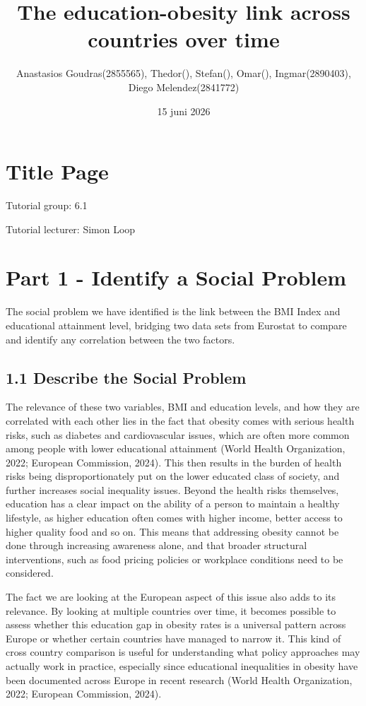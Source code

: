 \documentclass[
]{article}
\title{The education-obesity link across countries over time}
\author{Anastasios Goudras(2855565), Thedor(), Stefan(), Omar(),
Ingmar(2890403), Diego Melendez(2841772)}
\date{15 juni 2026}
\begin{document}
\maketitle

{
\setcounter{tocdepth}{2}
\tableofcontents
}
\section{Title Page}\label{title-page}

Tutorial group: 6.1

Tutorial lecturer: Simon Loop

\section{Part 1 - Identify a Social
Problem}\label{part-1---identify-a-social-problem}

The social problem we have identified is the link between the BMI Index
and educational attainment level, bridging two data sets from Eurostat
to compare and identify any correlation between the two factors.

\subsection{1.1 Describe the Social
Problem}\label{describe-the-social-problem}

The relevance of these two variables, BMI and education levels, and how
they are correlated with each other lies in the fact that obesity comes
with serious health risks, such as diabetes and cardiovascular issues,
which are often more common among people with lower educational
attainment (World Health Organization, 2022; European Commission, 2024).
This then results in the burden of health risks being disproportionately
put on the lower educated class of society, and further increases social
inequality issues. Beyond the health risks themselves, education has a
clear impact on the ability of a person to maintain a healthy lifestyle,
as higher education often comes with higher income, better access to
higher quality food and so on. This means that addressing obesity cannot
be done through increasing awareness alone, and that broader structural
interventions, such as food pricing policies or workplace conditions
need to be considered.

The fact we are looking at the European aspect of this issue also adds
to its relevance. By looking at multiple countries over time, it becomes
possible to assess whether this education gap in obesity rates is a
universal pattern across Europe or whether certain countries have
managed to narrow it. This kind of cross country comparison is useful
for understanding what policy approaches may actually work in practice,
especially since educational inequalities in obesity have been
documented across Europe in recent research (World Health Organization,
2022; European Commission, 2024).
\end{document}
